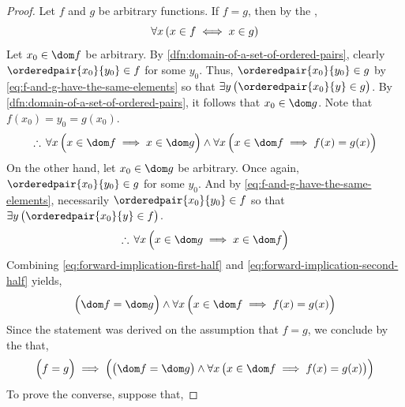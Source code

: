 \begin{proof}
    Let \( f \) and \( g \) be arbitrary functions. If \( f = g \), then by the ,
    \begin{equation}
        \label{eq:f-and-g-have-the-same-elements}
        \forall x \, \mleft( x \in f \iff x \in g \mright)
    \end{equation}
    Let \( x_{0} \in \dom f \) be arbitrary. By \cref{dfn:domain-of-a-set-of-ordered-pairs}, clearly
    \( \orderedpair{x_{0}}{y_{0}} \in f \) for some \( y_{0} \). Thus, \( \orderedpair{x_{0}}{y_{0}} \in g \)
    by \eqref{eq:f-and-g-have-the-same-elements} so that \( \exists y \, \big( \orderedpair{x_{0}}{y} \in g \big) \).
    By \cref{dfn:domain-of-a-set-of-ordered-pairs}, it follows that \( x_{0} \in \dom g \).
    Note that \( f(x_{0}) = y_{0} = g(x_{0}) \).
    \begin{equation}
        \label{eq:forward-implication-first-half}
        \therefore \, \forall x \, \Big( x \in \dom f \implies x \in \dom g \Big)
        \land
        \forall x \, \Big( x \in \dom f \implies f(x) = g(x) \Big)
    \end{equation}
    On the other hand, let \( x_{0} \in \dom g \) be arbitrary. Once again, \( \orderedpair{x_{0}}{y_{0}} \in g \)
    for some \( y_{0} \). And by \eqref{eq:f-and-g-have-the-same-elements}, necessarily \( \orderedpair{x_{0}}{y_{0}} \in f \)
    so that \( \exists y \, \big( \orderedpair{x_{0}}{y} \in f \big) \).
    \begin{equation}
        \label{eq:forward-implication-second-half}
        \therefore \, \forall x \, \Big( x \in \dom g \implies x \in \dom f \Big)
    \end{equation}
    Combining \eqref{eq:forward-implication-first-half} and \eqref{eq:forward-implication-second-half} yields,
    \begin{equation*}
        \Big( \dom f = \dom g \Big) \land \forall x \, \Big( x \in \dom f \implies f(x) = g(x) \Big)
    \end{equation*}
    Since the statement was derived on the assumption that \( f = g \), we conclude by the  that,
    \begin{equation}
        \label{eq:f-equals-g-implies-equal-domains-and-equal-ranges}
        \Big( f = g \Big) \implies \Big( \big( \dom f = \dom g \big) \land \forall x \, \big( x \in \dom f \implies f(x) = g(x) \big) \Big)
    \end{equation}
    To prove the converse, suppose that,

\end{proof}
